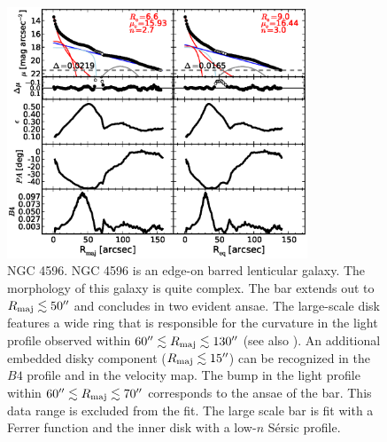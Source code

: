 \documentclass[preprint2]{emulateapj}
\newcommand{\fitfigurewidth}{0.8\textwidth}
\begin{document}
  \begin{figure}[h]
  \begin{center}
  \includegraphics[width=\fitfigurewidth]{images/n4596_1Dfit.eps}
  \caption{NGC 4596.
  NGC 4596 is an edge-on barred lenticular galaxy.
  The morphology of this galaxy is quite complex. 
  The bar extends out to $R_{\rm maj} \lesssim 50''$ and concludes in two evident ansae.
  The large-scale disk features a wide ring that is responsible for the curvature in the light profile observed within 
  $60'' \lesssim R_{\rm maj} \lesssim 130''$ (see also \citealt{comeron2014}).
  An additional embedded disky component ($R_{\rm maj} \lesssim 15''$) can be recognized in the $B4$ profile and in the velocity map.
  The bump in the light profile within $60'' \lesssim R_{\rm maj} \lesssim 70''$ corresponds to the ansae of the bar.
  This data range is excluded from the fit.
  The large scale bar is fit with a Ferrer function and the inner disk with a low-$n$ S\'ersic profile.
  }
  \end{center}
  \end{figure}
\end{document}
